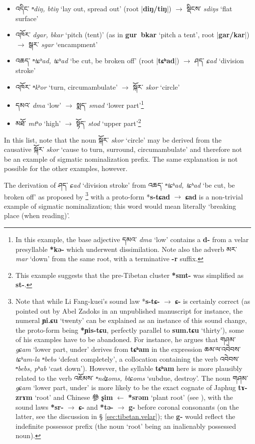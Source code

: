 \documentclass[oneside,a4paper,11pt]{article}
\newcommand{\ipa}[1]{\textbf{{\phon\mbox{#1}}}} %
\newcommand{\zh}[1]{{\cn #1}}
\newcommand{\tibet}[3]{{\tibetain#1} \textit{\phon#2} `#3'}
\newcommand{\dhat}[1]{|\ipa{#1}|}
\begin{document}
\begin{itemize}
\item \tibet{འདིང་}{ⁿdiŋ, btiŋ}{lay out, spread out} (root \dhat{diŋ/tiŋ}) $\rightarrow$	\tibet{སྡིངས་}{sdiŋs}{flat surface} 
\item \tibet{འཁོར་}{dgar, bkar}{pitch (tent)} (as in \ipa{gur bkar} `pitch a tent', root \dhat{gar/kar}) $\rightarrow$	\tibet{སྒར་}{sgar}{encampment} 
\item \tibet{འཆད་}{ⁿtɕʰad, tɕʰad}{be cut, be broken off} (root \dhat{tɕʰad}) $\rightarrow$	\tibet{ཤད་}{ɕad}{division stroke} 
\item \tibet{འཁོར་}{ⁿkʰor}{turn, circumambulate} $\rightarrow$	\tibet{སྐོར་}{skor}{circle} 
\item \tibet{དམའ་}{dma}{low} $\rightarrow$	\tibet{སྨད་}{smad}{lower part}\footnote{In this example, the base adjective \tibet{དམའ་}{dma}{low} contains a \ipa{d-} from a velar presyllable \ipa{*kə-} which underwent dissimilation. Note also the adverb \tibet{མར་}{mar}{down} from the same root, with a terminative \ipa{-r} suffix. }
\item \tibet{མཐོ་}{mtʰo}{high} $\rightarrow$	\tibet{སྟོད་}{stod}{upper part}\footnote{This example suggests that the pre-Tibetan cluster \ipa{*smt-} was simplified as \ipa{st-}. }
\end{itemize}
 
In this list, note that the noun \tibet{སྐོར་}{skor}{circle} may be derived from the causative \tibet{སྐོར་}{skor}{cause to turn, surround, circumambulate} and therefore not be an example of sigmatic nominalization prefix. The same explanation is not possible for the other examples, however. 

The derivation of \tibet{ཤད་}{ɕad}{division stroke} from \tibet{འཆད་}{ⁿtɕʰad, tɕʰad}{be cut, be broken off} as proposed by \citet[141]{lifk33}\footnote{Note that while Li Fang-kuei's sound law *\ipa{s-tɕ-} $\rightarrow$ \ipa{ɕ-} is certainly correct (as pointed out by Abel Zadoks in an unpublished manuscript for instance, the numeral \ipa{ɲi.ɕu} `twenty' can be explained as an instance of this sound change, the proto-form being \ipa{*ɲis-tɕu}, perfectly parallel to \ipa{sum.tɕu} `thirty'), some of his examples have to be abandoned. For instance, he argues that \tibet{གཤམ་}{gɕam}{lower part, under} derives from  \ipa{tɕʰam} in the expression \tibet{ཆམ་ལ་འབེབས་}{tɕʰam-la ⁿbebs}{defeat completely}, a collocation containing the verb \tibet{འབེབས་}{ⁿbebs, pʰab}{cast down}). However, the syllable \ipa{tɕʰam} here is more plausibly related to the verb \tibet{འཇོམས་}{ⁿndʑoms, btɕoms}{subdue, destroy}. The noun \tibet{གཤམ་}{gɕam}{lower part, under} is more likely to be the exact cognate of Japhug \ipa{tɤ-zrɤm} `root' and Chinese \zh{參} \ipa{ʂim} $\leftarrow$ \ipa{*srəm} `plant root' (see \citealt{jacques15sr}), with the sound laws \ipa{*sr-} $\rightarrow$ \ipa{ɕ-} and \ipa{*tə-} $\rightarrow$ \ipa{g-} before coronal consonants (on the latter, see the discussion in § \ref{sec:tibetan.velar}); the \ipa{g-} would reflect the indefinite possessor prefix (the noun `root' being an inalienably possessed noun). } with a proto-form *\ipa{s-tɕad} $\rightarrow$ \ipa{ɕad} is a non-trivial example of sigmatic nominalization; this word would mean literally `breaking place (when reading)'.  
\end{document}
